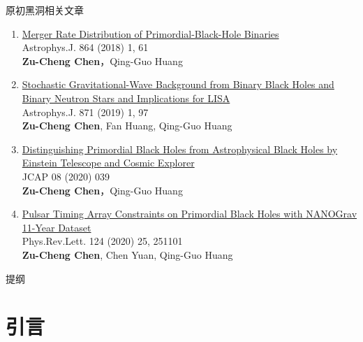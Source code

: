 \documentclass[xcolor={svgnames},compress]{beamer}
\let\olditem\item
\renewcommand{\item}{%
    \olditem\vspace{\fill}}
\begin{document}
\begin{frame}{原初黑洞相关文章}
    \vspace{-2mm}
    \begin{enumerate}
        \item \href{https://iopscience.iop.org/article/10.3847/1538-4357/aad6e2}{Merger Rate Distribution of Primordial-Black-Hole Binaries}\\
        Astrophys.J. 864 (2018) 1, 61\\
        \textbf{Zu-Cheng Chen}，Qing-Guo Huang
        
        \item \href{https://iopscience.iop.org/article/10.3847/1538-4357/aaf581}{Stochastic Gravitational-Wave Background from Binary Black Holes and Binary Neutron Stars and Implications for LISA}\\
        Astrophys.J. 871 (2019) 1, 97\\
        \textbf{Zu-Cheng Chen}, Fan Huang, Qing-Guo Huang
        
        \item \href{https://iopscience.iop.org/article/10.1088/1475-7516/2020/08/039}{Distinguishing Primordial Black Holes from Astrophysical Black Holes by Einstein Telescope and Cosmic Explorer}\\
        JCAP 08 (2020) 039\\
        \textbf{Zu-Cheng Chen}，Qing-Guo Huang
        
        \item \href{https://journals.aps.org/prl/abstract/10.1103/PhysRevLett.124.251101}{Pulsar Timing Array Constraints on Primordial Black Holes with NANOGrav 11-Year Dataset}\\
        Phys.Rev.Lett. 124 (2020) 25, 251101\\    
        \textbf{Zu-Cheng Chen}, Chen Yuan, Qing-Guo Huang 
        
    \end{enumerate} 
\end{frame}
\begin{frame}{提纲}
    \tableofcontents
\end{frame}

\section{引言}
\end{document}

